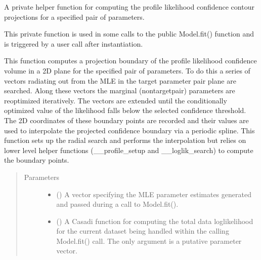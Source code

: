 \documentclass[letterpaper,10pt,english,openany,oneside]{sphinxmanual}
\begin{document}
\begin{fulllineitems}
\begin{fulllineitems}
\end{fulllineitems}


\begin{fulllineitems}
\label{\detokenize{nloed:nloed.model.Model.__contour_trace}}
A private helper function for computing the profile likelihood confidence contour
projections for a specified pair of parameters.

This private function is used in some calls to the public Model.fit() function and is
triggered by a user call after instantiation.

This function computes a projection boundary of the profile likelihood confidence volume in
a 2D plane for the specified pair of parameters. To do this a series of vectors radiating
out from the MLE in the target parameter pair plane are searched. Along these vectors the
marginal (non\sphinxhyphen{}target\sphinxhyphen{}pair) parameters are re\sphinxhyphen{}optimized iteratively. The vectors are extended
until the conditionally optimized value of the likelihood falls below the selected confidence
threshold. The 2D coordinates of these boundary points are recorded and their values are used
to interpolate the projected confidence boundary via a periodic spline. This function
sets up the radial search and performs the interpolation but relies on lower level helper
functions (\_\_profile\_setup and \_\_loglik\_search) to compute the boundary points.
\begin{quote}\begin{description}
\item[{Parameters}] \leavevmode\begin{itemize}
\item {} 
 (\sphinxstyleliteralemphasis{\sphinxupquote{, }}) \textendash{} A vector specifying the MLE parameter estimates generated and
passed during a call to Model.fit().

\item {} 
 () \textendash{} A Casadi function for computing the total data log\sphinxhyphen{}likelihood
for the current dataset being handled within the calling Model.fit() call. The only
argument is a putative parameter vector.


\end{itemize}
\end{description}
\end{quote}
\end{fulllineitems}
\end{fulllineitems}
\end{document}
